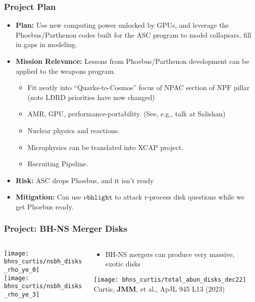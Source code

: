 \documentclass[]{beamer}
\begin{document}
\begin{frame}
  \frametitle{Project Plan}
  \begin{itemize}
  \item \textbf{Plan:} Use new computing power unlocked by GPUs, and leverage the
    Phoebus/Parthenon codes built for the ASC program to model
    collapsars, fill in gaps in modeling.
  \item \textbf{Mission Relevance:} Lessons from Phoebus/Parthenon
    development can be applied to the weapons program.
    \begin{itemize}
    \item Fit neatly into ``Quarks-to-Cosmos'' focus of NPAC section
      of NPF pillar (note LDRD priorities have now changed)
    \item AMR, GPU, performance-portability. (See, e.g., talk at Salishan)
    \item Nuclear physics and reactions.
    \item Microphysics can be translated into XCAP project.
    \item Recruiting Pipeline.
    \end{itemize}
  \item \textbf{Risk:} ASC drops Phoebus, and it isn't ready
  \item \textbf{Mitigation:} Can use $\nu\texttt{bhlight}$ to attack
    r-process disk questions while we get Phoebus ready.
  \end{itemize}
\end{frame}

\begin{frame}
  \frametitle{Project: BH-NS Merger Disks}
  \begin{columns}
    \begin{column}{6cm}
      \begin{center}
        \texttt{[image: bhns\_curtis/nsbh\_disks\_rho\_ye\_0]}\\
        \texttt{[image: bhns\_curtis/nsbh\_disks\_rho\_ye\_3]}
      \end{center}
    \end{column}
    \begin{column}{6cm}
      \begin{itemize}
      \item BH-NS mergers can produce very massive, exotic disks
      \end{itemize}
      \begin{center}
        \texttt{[image: bhns\_curtis/total\_abun\_disks\_dec22]}
        {\footnotesize Curtis, \textbf{JMM}, et al., ApJL 945 L13 (2023)}
      \end{center}
    \end{column}
  \end{columns}
\end{frame}
\end{document}

